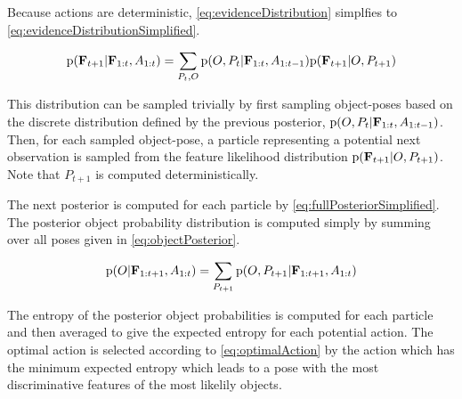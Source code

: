                 Because actions are deterministic, \eqref{eq:evidenceDistribution} simplfies to \eqref{eq:evidenceDistributionSimplified}.

                \begin{equation}
                    \label{eq:evidenceDistributionSimplified}
                    \text{p}(\mathbf{F}_{t+1}|\mathbf{F}_{1:t}, A_{1:t}) = \sum_{P_t,O} \text{p}(O,P_t|\mathbf{F}_{1:t},A_{1:t-1}) \text{p}(\mathbf{F}_{t+1}|O,P_{t+1})
                \end{equation}

                This distribution can be sampled trivially by first sampling object-poses based on the discrete distribution defined by the previous posterior, $\text{p}(O,P_t|\mathbf{F}_{1:t},A_{1:t-1})$. Then, for each sampled object-pose, a particle representing a potential next observation is sampled from the feature likelihood distribution $\text{p}(\mathbf{F}_{t+1}|O,P_{t+1})$. Note that $P_{t+1}$ is computed deterministically.

                The next posterior is computed for each particle by \eqref{eq:fullPosteriorSimplified}. The posterior object probability distribution is computed simply by summing over all poses given in \eqref{eq:objectPosterior}.

                \begin{equation}
                    \label{eq:objectPosterior}
                    \text{p}(O|\mathbf{F}_{1:t+1},A_{1:t}) = \sum_{P_{t+1}} \text{p}(O,P_{t+1}|\mathbf{F}_{1:t+1},A_{1:t})
                \end{equation}

                The entropy of the posterior object probabilities is computed for each particle and then averaged to give the expected entropy for each potential action. The optimal action is selected according to \eqref{eq:optimalAction} by the action which has the minimum expected entropy which leads to a pose with the most discriminative features of the most likelily objects.
